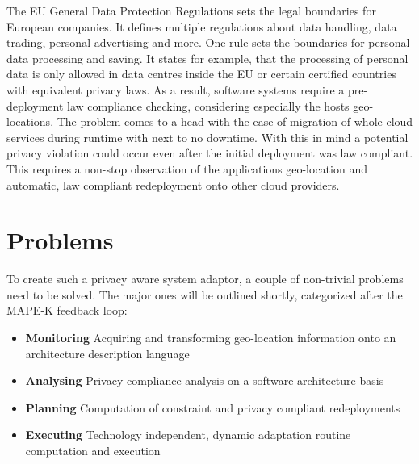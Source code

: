 The EU General Data Protection Regulations sets the legal boundaries for European companies. It defines multiple regulations about data handling, data trading, personal advertising and more. One rule sets the boundaries for personal data processing and saving. It states for example, that the processing of personal data is only allowed in data centres inside the EU or certain certified countries with equivalent privacy laws. As a result, software systems require a pre-deployment law compliance checking, considering especially the hosts geo-locations. The problem comes to a head with the ease of migration of whole cloud services during runtime with next to no downtime. With this in mind a potential privacy violation could occur even after the initial deployment was law compliant. This requires a non-stop observation of the applications geo-location and automatic, law compliant redeployment onto other cloud providers.


\section{Problems}
\label{sec:Introduction:problems}

To create such a privacy aware system adaptor, a couple of non-trivial problems need to be solved. The major ones will be outlined shortly, categorized after the MAPE-K feedback loop:

\begin{itemize}
	\setlength\itemsep{0em}
	\item \textbf{Monitoring}\newline
	Acquiring and transforming geo-location information onto an architecture description language
	\item \textbf{Analysing}\newline
	Privacy compliance analysis on a software architecture basis
	\item \textbf{Planning}\newline
	Computation of constraint and privacy compliant redeployments
	\item \textbf{Executing}\newline
	Technology independent, dynamic adaptation routine computation and execution
\end{itemize}


